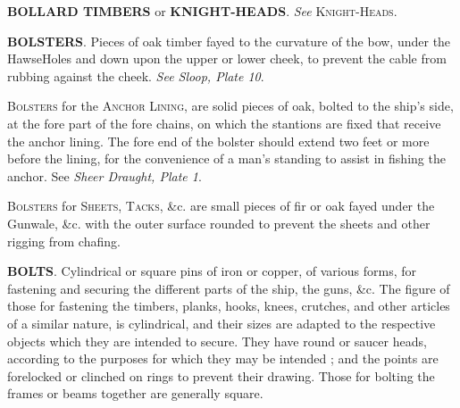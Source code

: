 \textbf{BOLLARD TIMBERS} or \textbf{KNIGHT-HEADS}. \textit{See} \textsc{Knight-Heads}. 

\textbf{BOLSTERS}. Pieces of oak timber fayed to the curvature of the bow, under the HawseHoles and down upon the upper or lower cheek, to prevent the cable from rubbing against the cheek. \textit{See Sloop, Plate 10}. 

\textsc{Bolsters} for the \textsc{Anchor Lining}, are solid pieces of oak, bolted to the ship's side, at the fore part of the fore chains, on which the stantions are fixed that receive the anchor lining. The fore end of the bolster should extend two feet or more before the lining, for the convenience of a man's standing to assist in fishing the anchor. See \textit{Sheer Draught, Plate 1}. 

\textsc{Bolsters} for \textsc{Sheets, Tacks,} \&c. are small pieces of fir or oak fayed under the Gunwale, \&c. with the outer surface rounded to prevent the sheets and other rigging from chafing. 

\textbf{BOLTS}. Cylindrical or square pins of iron or copper, of various forms, for fastening and securing the different parts of the ship, the guns, \&c. The figure of those for fastening the timbers, planks, hooks, knees, crutches, and other articles of a similar nature, is cylindrical, and their sizes are adapted to the respective objects which they are intended to secure. They have round or saucer heads, according to the purposes for which they may be intended ; and the points are forelocked or clinched on rings to prevent their drawing. Those for bolting the frames or beams together are generally square. 

